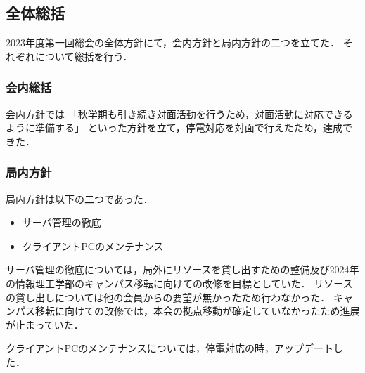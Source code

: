 \subsection*{全体総括}


2023年度第一回総会の全体方針にて，会内方針と局内方針の二つを立てた．
それぞれについて総括を行う．

\subsubsection*{会内総括}
会内方針では
「秋学期も引き続き対面活動を行うため，対面活動に対応できるように準備する」
といった方針を立て，停電対応を対面で行えたため，達成できた．

\subsubsection*{局内方針}

局内方針は以下の二つであった．
\begin{itemize}
    \item サーバ管理の徹底
    \item クライアントPCのメンテナンス
\end{itemize}

サーバ管理の徹底については，局外にリソースを貸し出すための整備及び2024年の情報理工学部のキャンパス移転に向けての改修を目標としていた．
リソースの貸し出しについては他の会員からの要望が無かったため行わなかった．
キャンパス移転に向けての改修では，本会の拠点移動が確定していなかったため進展が止まっていた．

クライアントPCのメンテナンスについては，停電対応の時，アップデートした．
